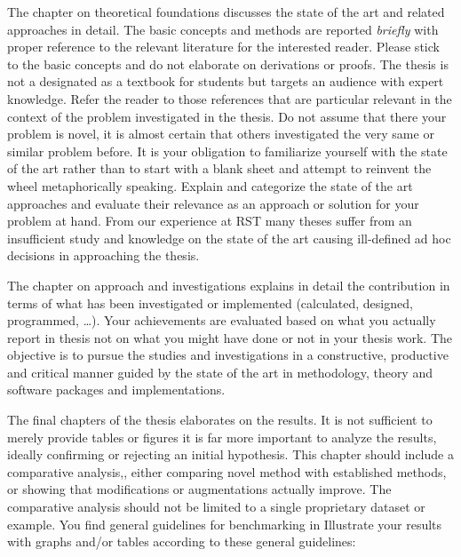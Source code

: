 The chapter on theoretical foundations discusses the state of the art and related approaches in detail.
The basic concepts and methods are reported \emph{briefly} with proper reference to the relevant literature for the interested reader.
Please stick to the basic concepts and do not elaborate on derivations or proofs. The thesis is not a designated as a textbook for students but targets an audience with expert knowledge.
Refer the reader to those references that are particular relevant in the context of the problem investigated in the thesis. Do not assume that there your problem is novel, it is almost certain that others investigated the very same or similar problem before.
It is your obligation to familiarize yourself with the state of the art rather
than to start with a blank sheet and attempt to reinvent the wheel metaphorically speaking.
Explain and categorize the state of the art approaches and evaluate their relevance
as an approach or solution for your problem at hand.
From our experience at RST many theses suffer from an insufficient study and knowledge
on the state of the art causing ill-defined ad hoc decisions in
approaching the thesis.

The chapter on approach and investigations explains in detail the contribution in terms of what has been investigated or implemented (calculated, designed, programmed, \ldots).
Your achievements are evaluated based on what you actually report in thesis not on what you might have done or not in your thesis work.
The objective is to pursue the studies and investigations in a constructive, productive and critical manner guided by the state of the art in methodology, theory and software packages and implementations. 

The final chapters of the thesis elaborates on the results. It is not sufficient to merely
provide tables or figures it is far more important to analyze the results, ideally confirming or rejecting an initial hypothesis. This chapter should include a comparative analysis,,
either comparing novel method with established methods, or showing that modifications or augmentations actually improve. The comparative analysis should not be limited to a single proprietary dataset or example. You find general guidelines for benchmarking in \cite{Hoff2019}  
Illustrate your results with graphs and/or tables according to these
general guidelines:

